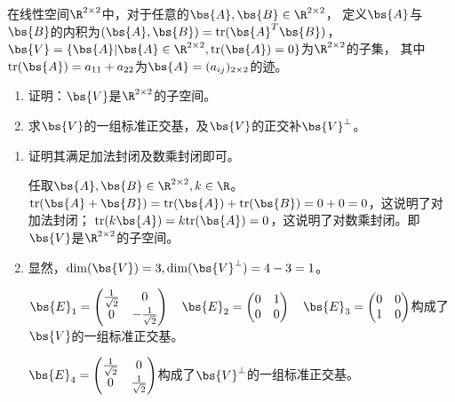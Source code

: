 \documentclass[12pt, a4paper, oneside, UTF8]{ctexbook}
\begin{document}
\begin{question}
    在线性空间$\R^{2\times 2}$中，对于任意的$\bs{A},\bs{B}\in \R^{2\times 2}$，
    定义$\bs{A}$与$\bs{B}$的内积为$(\bs{A},\bs{B})=\mathrm{tr}(\bs{A}^T\bs{B})$，
    $\bs{V}=\{\bs{A}|\bs{A}\in \R^{2\times 2} ,\mathrm{tr}(\bs{A})=0\}$为$\R^{2\times2}$的子集，
    其中$\mathrm{tr}(\bs{A})=a_{11}+a_{22}$为$\bs{A}=(a_{ij})_{2\times 2}$的迹。
    \begin{enumerate}[label=(\arabic{*})]
        \item 证明：$\bs{V}$是$\R^{2\times 2}$的子空间。
        \item 求$\bs{V}$的一组标准正交基，及$\bs{V}$的正交补$\bs{V}^{\perp}$。
    \end{enumerate}
\end{question}

\begin{solution}
    \begin{enumerate}[label=(\arabic{*})]
        \item 证明其满足加法封闭及数乘封闭即可。
        
        任取$\bs{A},\bs{B} \in \R^{2\times 2},k \in \R$。
        $\mathrm{tr}(\bs{A}+\bs{B})=\mathrm{tr}(\bs{A})+\mathrm{tr}(\bs{B})=0+0=0$，这说明了对加法封闭；
        $\mathrm{tr}(k\bs{A})=k\mathrm{tr}(\bs{A})=0$，这说明了对数乘封闭。即$\bs{V}$是$\R^{2\times 2}$的子空间。
        \item 显然，$\mathrm{dim}(\bs{V})=3,\mathrm{dim}(\bs{V}^{\perp})=4-3=1$。
        
        $\bs{E}_1=\begin{pmatrix}
            \frac{1}{\sqrt{2}}&0\\
            0&-\frac{1}{\sqrt{2}}
        \end{pmatrix} \quad 
        \bs{E}_2=\begin{pmatrix}
            0&1\\
            0&0
        \end{pmatrix} \quad 
        \bs{E}_3=\begin{pmatrix}
            0&0\\
            1&0
        \end{pmatrix}$构成了$\bs{V}$的一组标准正交基。

        $\bs{E}_4=\begin{pmatrix}
            \frac{1}{\sqrt{2}}&0\\
            0&\frac{1}{\sqrt{2}}
        \end{pmatrix}$构成了$\bs{V}^{\perp}$的一组标准正交基。
    \end{enumerate}
\end{solution}
\end{document}
